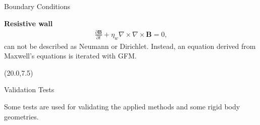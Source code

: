 \documentclass[final]{beamer}
\begin{document}
\begin{frame}{}
\begin{textblock}{19.0}
\begin{block}{Boundary Conditions}
\begin{minipage}{0.93\linewidth}
	\textbf{Resistive wall}
	\begin{align*}
		\frac{\partial \mathbf{B}}{\partial t}+\eta_{w}\nabla\times\nabla\times\mathbf{B}=0
		\label{equ:magneticDiffusion},
	\end{align*}
	can not be described as Neumann or Dirichlet. Instead, an equation derived from Maxwell's equations is iterated with GFM.
\end{minipage}
\end{block}



\end{textblock}


\begin{textblock}{19.0}(20.0,7.5)
\begin{block}{Validation Tests}
	\begin{minipage}{0.90\linewidth}
		Some tests are used for validating the applied methods and some rigid body geometries. 
		\vspace{0.5cm}
		

\end{minipage}
\end{block}
\end{textblock}
\end{frame}
\end{document}
